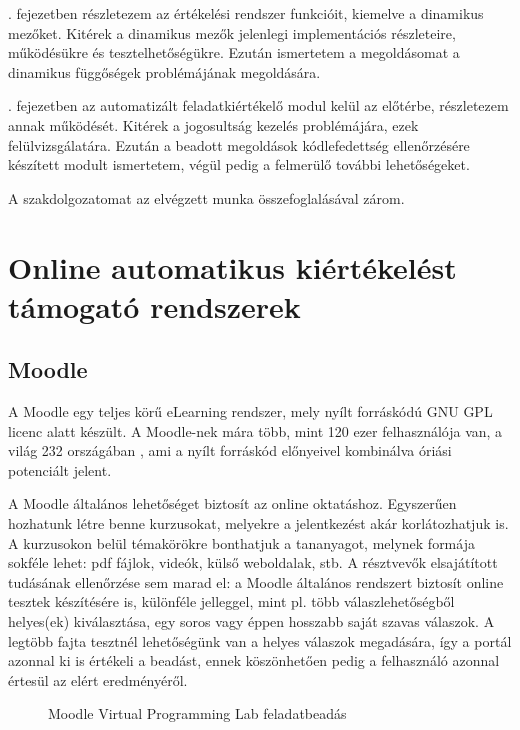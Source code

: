 . fejezetben részletezem az értékelési rendszer funkcióit, kiemelve a dinamikus mezőket. Kitérek a dinamikus mezők jelenlegi implementációs részleteire, működésükre és tesztelhetőségükre. Ezután ismertetem a megoldásomat a dinamikus függőségek problémájának megoldására.

. fejezetben az automatizált feladatkiértékelő modul kelül az előtérbe, részletezem annak működését. Kitérek a jogosultság kezelés problémájára, ezek felülvizsgálatára. Ezután a beadott megoldások kódlefedettség ellenőrzésére készített modult ismertetem, végül pedig a felmerülő további lehetőségeket.

A szakdolgozatomat az elvégzett munka összefoglalásával zárom.

\chapter{Online automatikus kiértékelést támogató rendszerek}\label{chapter:othersystems}

\section{Moodle}
A Moodle \cite{Moodle} egy teljes körű eLearning rendszer, mely nyílt forráskódú GNU GPL \cite{GNUGPL} licenc alatt készült. A Moodle-nek mára több, mint 120 ezer felhasználója van, a világ 232 országában \cite{MoodleStats}, ami a nyílt forráskód előnyeivel kombinálva óriási potenciált jelent. 

A Moodle általános lehetőséget biztosít az online oktatáshoz. Egyszerűen hozhatunk létre benne kurzusokat, melyekre a jelentkezést akár korlátozhatjuk is. A kurzusokon belül témakörökre bonthatjuk a tananyagot, melynek formája sokféle lehet: pdf fájlok, videók, külső weboldalak, stb. A résztvevők elsajátított tudásának ellenőrzése sem marad el: a Moodle általános rendszert biztosít online tesztek készítésére is, különféle jelleggel, mint pl. több válaszlehetőségből helyes(ek) kiválasztása, egy soros vagy éppen hosszabb saját szavas válaszok. A legtöbb fajta tesztnél lehetőségünk van a helyes válaszok megadására, így a portál azonnal ki is értékeli a beadást, ennek köszönhetően pedig a felhasználó azonnal értesül az elért eredményéről.

\begin{figure}[h]
    \centering
    \caption{Moodle Virtual Programming Lab feladatbeadás}
    \label{fig:moodle_vpl}
\end{figure}

